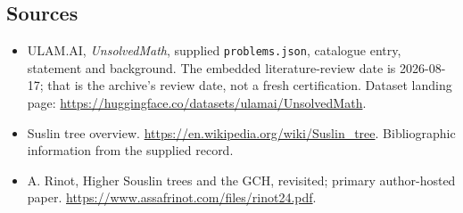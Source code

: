 \documentclass[11pt,a4paper]{article}
\begin{document}
\subsection{Sources}

{\small

\begin{itemize}

\item[\hypertarget{source:statement:1}{S1}] ULAM.AI, \emph{UnsolvedMath}, supplied \texttt{problems.json}, catalogue entry, statement and background. The embedded literature-review date is 2026-08-17; that is the archive’s review date, not a fresh certification. Dataset landing page: \url{https://huggingface.co/datasets/ulamai/UnsolvedMath}.

\item[\hypertarget{source:statement:2}{S2}] Suslin tree overview. \url{https://en.wikipedia.org/wiki/Suslin_tree}. Bibliographic information from the supplied record.

\item[R1] A. Rinot, Higher Souslin trees and the GCH, revisited; primary author-hosted paper.
\url{https://www.assafrinot.com/files/rinot24.pdf}.
\end{itemize}

}

\label{end:statement}
\end{document}
